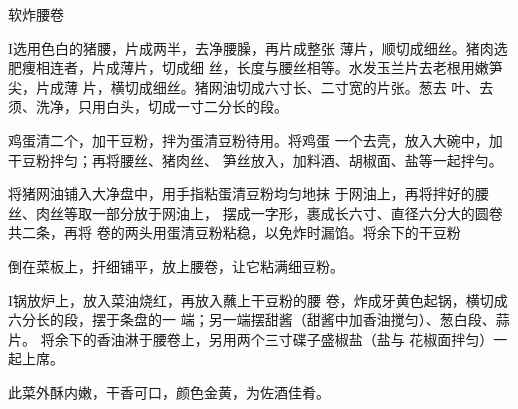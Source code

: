 \begin{recipe}{软炸腰卷}

\ingredients



\cooking

I选用色白的猪腰，片成两半，去净腰臊，再片成整张 薄片，顺切成细丝。猪肉选肥痩相连者，片成薄片，切成细 丝，长度与腰丝相等。水发玉兰片去老根用嫩笋尖，片成薄 片，横切成细丝。猪网油切成六寸长、二寸宽的片张。葱去 叶、去须、洗净，只用白头，切成一寸二分长的段。

\step 鸡蛋清二个，加干豆粉，拌为蛋清豆粉待用。将鸡蛋 一个去壳，放入大碗中，加干豆粉拌匀；再将腰丝、猪肉丝、 笋丝放入，加料酒、胡椒面、盐等一起拌勻。

\step 将猪网油铺入大净盘中，用手指粘蛋清豆粉均匀地抹 于网油上，再将拌好的腰丝、肉丝等取一部分放于网油上， 摆成一字形，裹成长六寸、直径六分大的圆卷共二条，再将 卷的两头用蛋清豆粉粘稳，以免炸时漏馅。将余下的干豆粉

倒在菜板上，扞细铺平，放上腰卷，让它粘满细豆粉。

I锅放炉上，放入菜油烧红，再放入蘸上干豆粉的腰 卷，炸成牙黄色起锅，横切成六分长的段，摆于条盘的一 端；另一端摆甜酱（甜酱中加香油搅匀）、葱白段、蒜片。 将余下的香油淋于腰卷上，另用两个三寸碟子盛椒盐（盐与 花椒面拌匀）一起上席。

\notes

此菜外酥内嫩，干香可口，颜色金黄，为佐酒佳肴。

\end{recipe}

